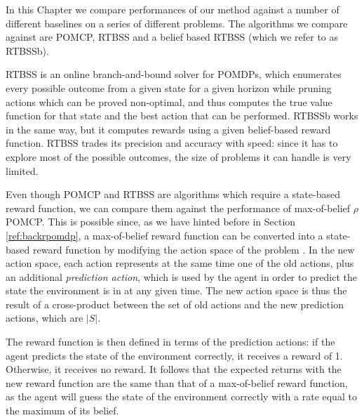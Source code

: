 In this %
Chapter we compare performances of our method against a number of different baselines on a
series of different problems. The algorithms we compare against are POMCP, RTBSS and a belief based
RTBSS (which we refer to as RTBSSb).

RTBSS \cite{cit:rtbss} is an online branch-and-bound solver \cite{cit:relworkonlineall} for POMDPs, which enumerates every possible outcome from
a given state for a given horizon while pruning actions which can be proved non-optimal, and thus computes the true value function for that state and the
best action that can be performed. RTBSSb works in the same way, but it computes rewards using a
given belief-based reward function. RTBSS trades its precision and accuracy with speed: since it has
to explore most of the possible outcomes, the size of problems it can handle is very limited.

Even though POMCP and RTBSS are algorithms which require a state-based reward function, we can
compare them against the performance of max-of-belief $\rho$POMCP. This is possible since, as we have hinted before in Section \ref{ref:backrpomdp}, a
max-of-belief reward function can be converted into a state-based reward function by modifying the
action space of the problem \cite{cit:pomdpir}. In the new action space, each action represents at
the same time one of the old actions, plus an additional \textit{prediction action}, which is used
by the agent in order to predict the state the environment is in at any given time. The new action
space is thus the result of a cross-product between the set of old actions and the new prediction
actions, which are $|S|$.

%

The reward function is then defined in terms of the prediction actions: if the agent predicts the
state of the environment correctly, it receives a reward of 1. Otherwise, it receives no reward. It
follows that the expected returns with the new reward function are the same than that of a
max-of-belief reward function, as the agent will guess the state of the environment correctly with a
rate equal to the maximum of its belief.

